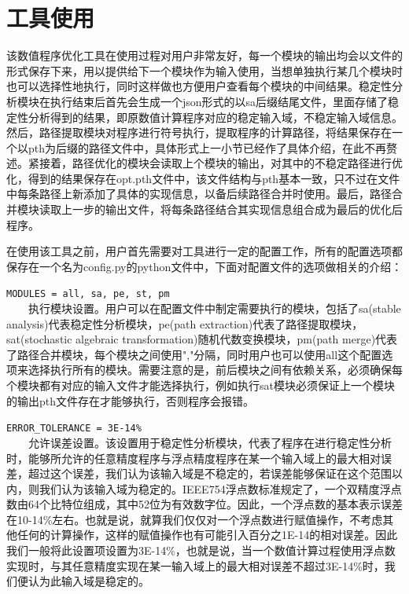 \section{工具使用}

该数值程序优化工具在使用过程对用户非常友好，每一个模块的输出均会以文件的形式保存下来，用以提供给下一个模块作为输入使用，当想单独执行某几个模块时也可以选择性地执行，同时这样做也方便用户查看每个模块的中间结果。稳定性分析模块在执行结束后首先会生成一个json形式的以sa后缀结尾文件，里面存储了稳定性分析得到的结果，即原数值计算程序对应的稳定输入域，不稳定输入域信息。然后，路径提取模块对程序进行符号执行，提取程序的计算路径，将结果保存在一个以pth为后缀的路径文件中，具体形式上一小节已经作了具体介绍，在此不再赘述。紧接着，路径优化的模块会读取上个模块的输出，对其中的不稳定路径进行优化，得到的结果保存在opt.pth文件中，该文件结构与pth基本一致，只不过在文件中每条路径上新添加了具体的实现信息，以备后续路径合并时使用。最后，路径合并模块读取上一步的输出文件，将每条路径结合其实现信息组合成为最后的优化后程序。

在使用该工具之前，用户首先需要对工具进行一定的配置工作，所有的配置选项都保存在一个名为config.py的python文件中，下面对配置文件的选项做相关的介绍：

\texttt{MODULES = all, sa, pe, st, pm}\\
　　执行模块设置。用户可以在配置文件中制定需要执行的模块，包括了sa(stable analysis)代表稳定性分析模块，pe(path extraction)代表了路径提取模块，sat(stochastic algebraic transformation)随机代数变换模块，pm(path merge)代表了路径合并模块，每个模块之间使用","分隔，同时用户也可以使用all这个配置选项来选择执行所有的模块。需要注意的是，前后模块之间有依赖关系，必须确保每个模块都有对应的输入文件才能选择执行，例如执行sat模块必须保证上一个模块的输出pth文件存在才能够执行，否则程序会报错。

\texttt{ERROR\_TOLERANCE = 3E-14\%}\\
　　允许误差设置。该设置用于稳定性分析模块，代表了程序在进行稳定性分析时，能够所允许的任意精度程序与浮点精度程序在某一个输入域上的最大相对误差，超过这个误差，我们认为该输入域是不稳定的，若误差能够保证在这个范围以内，则我们认为该输入域为稳定的。IEEE754浮点数标准规定了，一个双精度浮点数由64个比特位组成，其中52位为有效数字位。因此，一个浮点数的基本表示误差在10-14\%左右。也就是说，就算我们仅仅对一个浮点数进行赋值操作，不考虑其他任何的计算操作，这样的赋值操作也有可能引入百分之1E-14的相对误差。因此我们一般将此设置项设置为3E-14\%，也就是说，当一个数值计算过程使用浮点数实现时，与其任意精度实现在某一输入域上的最大相对误差不超过3E-14\%时，我们便认为此输入域是稳定的。

